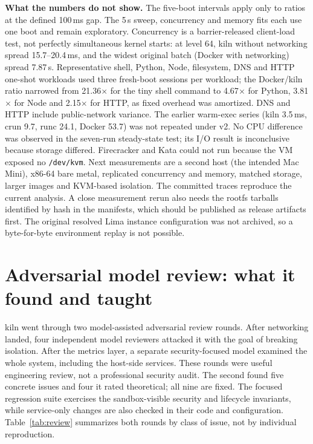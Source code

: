 \documentclass[10pt,letterpaper]{article}
\newcommand{\code}[1]{\texttt{#1}}
\begin{document}
\textbf{What the numbers do not show.} The five-boot intervals apply only to
ratios at the defined 100\,ms gap. The 5\,s sweep, concurrency and memory fits
each use one boot and remain exploratory. Concurrency is a barrier-released
client-load test, not perfectly simultaneous kernel starts: at level 64,
kiln without networking spread 15.7--20.4\,ms, and the widest original batch
(Docker with networking) spread 7.87\,s. Representative shell, Python, Node,
filesystem, DNS and HTTP one-shot workloads used three fresh-boot sessions per
workload;
the Docker/kiln ratio narrowed from 21.36$\times$ for the tiny shell command to
4.67$\times$ for Python, 3.81$\times$ for Node and 2.15$\times$ for HTTP, as
fixed overhead was amortized. DNS and HTTP include public-network variance.
The earlier warm-exec series
(kiln 3.5\,ms, crun 9.7, runc 24.1, Docker 53.7) was not repeated under v2.
No CPU difference was observed in the seven-run steady-state test; its I/O
result is inconclusive because storage differed. Firecracker and Kata could not
run because the VM exposed no \code{/dev/kvm}. Next measurements are a second
host (the intended Mac Mini), x86-64 bare metal, replicated concurrency and
memory, matched storage, larger images and KVM-based isolation. The committed
traces reproduce the current analysis. A close measurement rerun also needs the
rootfs tarballs identified by hash in the manifests, which should be published
as release artifacts first. The original resolved Lima instance configuration
was not archived, so a byte-for-byte environment replay is not possible.

\section{Adversarial model review: what it found and taught}
\label{sec:review}

kiln went through two model-assisted adversarial review rounds. After
networking landed, four independent model reviewers attacked it with the goal
of breaking isolation. After the metrics layer, a separate security-focused
model examined the whole system, including the host-side
services. These rounds were useful engineering review, not a professional
security audit. The second found five concrete issues and four it rated
theoretical; all nine are fixed. The focused regression suite exercises the
sandbox-visible security and lifecycle invariants, while service-only changes
are also checked in their code and configuration.
Table~\ref{tab:review} summarizes both rounds by class of issue, not by
individual reproduction.
\end{document}

